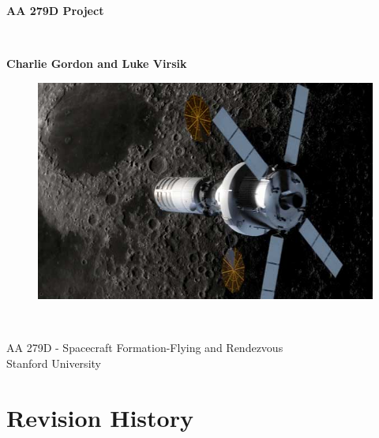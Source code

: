 \documentclass[11pt,letterpaper]{article}
\newcommand{\userName}{Charlie Gordon and Luke Virsik}
\begin{document}
\begin{titlepage}
    \begin{center}
        \vspace*{1cm}
        
        \Huge
        \textbf{AA 279D Project}
        
        \vspace{0.5cm}
        \LARGE
        \ 
        
        \vspace{1.00cm}
        \textbf{\userName}
        \vspace{1.00cm}
        
        \vfill
        \begin{figure}[H]
		\centering 
		\includegraphics[width = 5.5in]{Figures/Cygnus_LunarStation.jpg}
		\label{Figure: Title Graphic}
		\end{figure}
        \        
        
        \Large
        AA 279D - Spacecraft Formation-Flying and Rendezvous\\
        Stanford University\\
        
    \end{center}
\end{titlepage}

\section*{Revision History}
\end{document}

